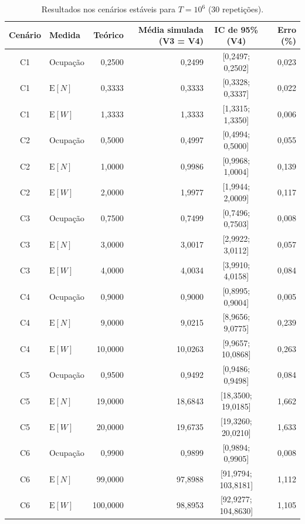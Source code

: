 \documentclass[
  article,      %
  10pt,         %
  oneside,
  a4paper,
  twocolumn,    %
  english,
  brazil        %
]{abntex2}
\newcommand{\EN}{\mathrm{E}[N]}
\newcommand{\EW}{\mathrm{E}[W]}
\begin{document}
\begin{table}[t]
  \centering
  \caption{Resultados nos cenários estáveis para $T=10^6$ (30 repetições).}
  \label{tab:resultados-estaveis}
  \small
  \begin{tabular}{clrrcr}
    \toprule
    Cenário & Medida & Teórico & Média simulada (V3 = V4) & IC de 95\% (V4) & Erro (\%) \\
    \midrule
    C1 & Ocupação & 0,2500 & 0,2499 & [0,2497; 0,2502] & 0,023 \\
    C1 & $\EN$    & 0,3333 & 0,3333 & [0,3328; 0,3337] & 0,022 \\
    C1 & $\EW$    & 1,3333 & 1,3333 & [1,3315; 1,3350] & 0,006 \\
    \midrule
    C2 & Ocupação & 0,5000 & 0,4997 & [0,4994; 0,5000] & 0,055 \\
    C2 & $\EN$    & 1,0000 & 0,9986 & [0,9968; 1,0004] & 0,139 \\
    C2 & $\EW$    & 2,0000 & 1,9977 & [1,9944; 2,0009] & 0,117 \\
    \midrule
    C3 & Ocupação & 0,7500 & 0,7499 & [0,7496; 0,7503] & 0,008 \\
    C3 & $\EN$    & 3,0000 & 3,0017 & [2,9922; 3,0112] & 0,057 \\
    C3 & $\EW$    & 4,0000 & 4,0034 & [3,9910; 4,0158] & 0,084 \\
    \midrule
    C4 & Ocupação & 0,9000 & 0,9000 & [0,8995; 0,9004] & 0,005 \\
    C4 & $\EN$    & 9,0000 & 9,0215 & [8,9656; 9,0775] & 0,239 \\
    C4 & $\EW$    & 10,0000 & 10,0263 & [9,9657; 10,0868] & 0,263 \\
    \midrule
    C5 & Ocupação & 0,9500 & 0,9492 & [0,9486; 0,9498] & 0,084 \\
    C5 & $\EN$    & 19,0000 & 18,6843 & [18,3500; 19,0185] & 1,662 \\
    C5 & $\EW$    & 20,0000 & 19,6735 & [19,3260; 20,0210] & 1,633 \\
    \midrule
    C6 & Ocupação & 0,9900 & 0,9899 & [0,9894; 0,9905] & 0,008 \\
    C6 & $\EN$    & 99,0000 & 97,8988 & [91,9794; 103,8181] & 1,112 \\
    C6 & $\EW$    & 100,0000 & 98,8953 & [92,9277; 104,8630] & 1,105 \\
    \bottomrule
  \end{tabular}
\end{table}
\end{document}
